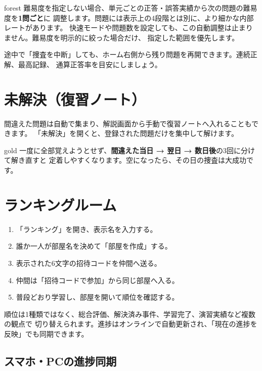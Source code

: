 \documentclass[11pt,a4paper]{ltjsarticle}
\begin{document}
\begin{casebox}[自動難易度と内部レート]{forest}
難易度を指定しない場合、単元ごとの正答・誤答実績から次の問題の難易度を\textbf{1問ごと}に
調整します。問題には表示上の4段階とは別に、より細かな内部レートがあります。
快速モードや問題数を設定しても、この自動調整は止まりません。難易度を明示的に絞った場合だけ、
指定した範囲を優先します。
\end{casebox}

途中で「捜査を中断」しても、ホーム右側から残り問題を再開できます。連続正解、最高記録、
通算正答率を目安にしましょう。

\section*{未解決（復習ノート）}

間違えた問題は自動で集まり、解説画面から手動で復習ノートへ入れることもできます。
「未解決」を開くと、登録された問題だけを集中して解けます。

\begin{casebox}[復習の小ルール]{gold}
一度に全部覚えようとせず、\textbf{間違えた当日 → 翌日 → 数日後}の3回に分けて解き直すと
定着しやすくなります。空になったら、その日の捜査は大成功です。
\end{casebox}

\section*{ランキングルーム}

\begin{enumerate}
\item 「ランキング」を開き、表示名を入力する。
\item 誰か一人が部屋名を決めて「部屋を作成」する。
\item 表示された6文字の招待コードを仲間へ送る。
\item 仲間は「招待コードで参加」から同じ部屋へ入る。
\item 普段どおり学習し、部屋を開いて順位を確認する。
\end{enumerate}

順位は1種類ではなく、総合評価、解決済み事件、学習完了、演習実績など複数の観点で
切り替えられます。進捗はオンラインで自動更新され、「現在の進捗を反映」でも同期できます。

\subsection*{スマホ・PCの進捗同期}
\end{document}
